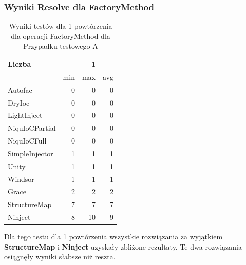 \documentclass[12pt]{article}
\begin{document}
\subsubsection{Wyniki Resolve dla FactoryMethod}
\begin{table}[H]
\captionsetup{belowskip=0pt,aboveskip=0pt}
\begin{center}
\begin{small}
	\begin{tabular}{ | l | r r r | }
    		\hline
Liczba & & 1 & \\ \hline
 & min & max & avg \\ \hline
Autofac & 0 & 0 & 0 \\ \hline
DryIoc & 0 & 0 & 0 \\ \hline
LightInject & 0 & 0 & 0 \\ \hline
NiquIoCPartial & 0 & 0 & 0 \\ \hline
NiquIoCFull & 0 & 0 & 0 \\ \hline
SimpleInjector & 1 & 1 & 1 \\ \hline
Unity & 1 & 1 & 1 \\ \hline
Windsor & 1 & 1 & 1 \\ \hline
Grace & 2 & 2 & 2 \\ \hline
StructureMap & 7 & 7 & 7 \\ \hline
Ninject & 8 & 10 & 9 \\ \hline
  	\end{tabular}
\end{small}
\end{center}
\caption{Wyniki testów dla 1 powtórzenia dla operacji FactoryMethod dla Przypadku testowego A}
\label{TestCaseA_FactoryMethod1}
\end{table}
Dla tego testu dla 1 powtórzenia wszystkie rozwiązania za wyjątkiem \textbf{StructureMap} i \textbf{Ninject} uzyskały zbliżone rezultaty. Te dwa rozwiązania osiągnęły wyniki słabsze niż reszta.
\end{document}

